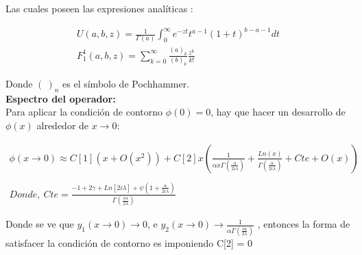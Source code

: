 Las cuales poseen las expresiones analíticas  : 

\begin{equation}
\begin{array}{c}
	U(a,b,z) = \frac{1}{\Gamma (a)} 
	\int _0 ^{\infty} e ^{-zt}
	t ^{a-1}
	(1+t) ^{b-a-1}
	dt \\
	F _1 ^1 (a,b,z) = \sum _ {k=0} ^{\infty} 
	\frac{(a) _k}{(b) _k} 
	\frac{z ^k}{k!} 
\end{array}
\end{equation}

Donde $( \   ) _n$ es el símbolo de Pochhammer. \\






\textbf{Espectro del operador:} \\


Para aplicar la condición de contorno $\phi (0) = 0$, hay que hacer un desarrollo de $\phi(x)$  alrededor de $x \rightarrow 0$:

\begin{equation}
\begin{array}{c}
\phi (x \rightarrow 0) \approx
C[1] ( x + O(x ^2)) + 
C[2] x 
\left( 
\frac{1}{  \alpha x  \Gamma ( \frac{ \alpha}{2 i \lambda}  )   }  +
\frac{Ln(x) }{\Gamma ( \frac{ \alpha}{2 i \lambda} ) } + Cte + O(x)
\right)
\\ \\
Donde,  \ Cte = 
\frac{
-1 + 2 \gamma + Ln[2 i \lambda] + \psi (1 + \frac{ \alpha}{2 i \lambda})
}
{\Gamma (\frac{i \alpha}{2 \lambda})}
\end{array}
\label{eq.scat}
\end{equation}

Donde se ve que $y _1 (x \rightarrow 0 ) \rightarrow 0$, e $y _2 (x \rightarrow 0)  \rightarrow
\frac{1}{  \alpha   \Gamma ( \frac{i \alpha}{2 \lambda}  )   } $ , entonces la forma de satisfacer la condición de contorno es imponiendo C[2] = 0

